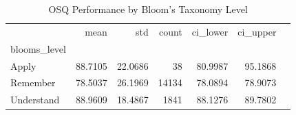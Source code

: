 \begin{table}[htbp]
\centering
\caption{OSQ Performance by Bloom's Taxonomy Level}
\label{tab:blooms_performance}
\begin{tabular}{lrrrrrr}
\toprule
 & mean & std & count & ci_lower & ci_upper \\
blooms_level &  &  &  &  &  \\
\midrule
Apply & 88.7105 & 22.0686 & 38 & 80.9987 & 95.1868 \\
Remember & 78.5037 & 26.1969 & 14134 & 78.0894 & 78.9073 \\
Understand & 88.9609 & 18.4867 & 1841 & 88.1276 & 89.7802 \\
\bottomrule
\end{tabular}

\end{table}
